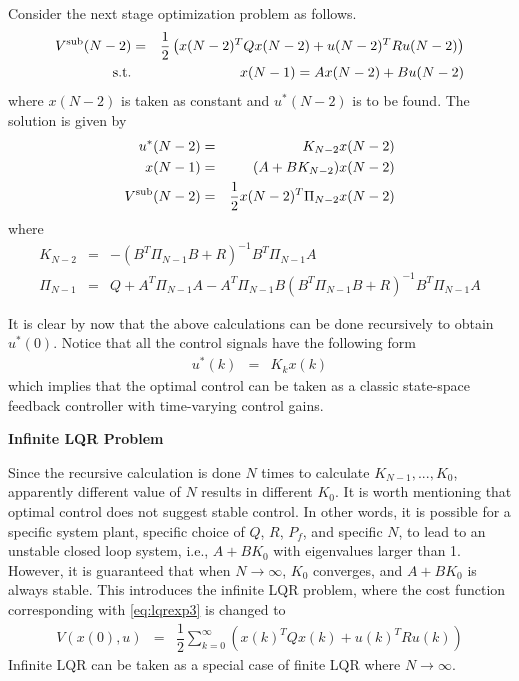 Consider the next stage optimization problem as follows.
\begin{eqnarray}
  V^{\textup{sub}}(N-2) &=& \dfrac{1}{2}\left(x(N-2)^TQx(N-2) + u(N-2)^TRu(N-2)\right) \nonumber \\
  \textup{s.t.} && x(N-1) = Ax(N-2) + Bu(N-2) \nonumber
\end{eqnarray}
where $x(N-2)$ is taken as constant and $u^*(N-2)$ is to be found. The solution is given by
\begin{eqnarray}
  u^*(N-2) &=& K_{N-2}x(N-2) \nonumber \\
  x(N-1) &=& (A+BK_{N-2})x(N-2) \nonumber \\
  V^{\textup{sub}}(N-2) &=& \dfrac{1}{2}x(N-2)^T\Pi_{N-2}x(N-2) \nonumber
\end{eqnarray}
where
\begin{eqnarray}
K_{N-2} &=& -(B^T\Pi_{N-1}B + R)^{-1}B^T\Pi_{N-1}A \nonumber \\
\Pi_{N-1} &=& Q + A^T\Pi_{N-1}A-A^T\Pi_{N-1}B(B^T\Pi_{N-1}B+R)^{-1}B^T\Pi_{N-1}A \nonumber
\end{eqnarray}

It is clear by now that the above calculations can be done recursively to obtain $u^*(0)$. Notice that all the control signals have the following form
\begin{eqnarray}
  u^*(k) &=& K_{k}x(k) \nonumber
\end{eqnarray}
which implies that the optimal control can be taken as a classic state-space feedback controller with time-varying control gains.

\vspace{0.1in}
\noindent \textbf{Infinite LQR Problem}
\vspace{0.1in}

Since the recursive calculation is done $N$ times to calculate $K_{N-1},...,K_0$, apparently different value of $N$ results in different $K_0$. It is worth mentioning that optimal control does not suggest stable control. In other words, it is possible for a specific system plant, specific choice of $Q$, $R$, $P_f$, and specific $N$, to lead to an unstable closed loop system, i.e., $A+BK_0$ with eigenvalues larger than 1.
However, it is guaranteed that when $N\rightarrow \infty$, $K_0$ converges, and $A+BK_0$ is always stable. This introduces the infinite LQR problem, where the cost function corresponding with \eqref{eq:lqrexp3} is changed to
\begin{eqnarray}
  V\left(x(0), u\right) &=& \dfrac{1}{2}\sum_{k=0}^{\infty}\left(x(k)^TQx(k) + u(k)^TRu(k)\right) \nonumber
\end{eqnarray}
Infinite LQR can be taken as a special case of finite LQR where $N\rightarrow\infty$.

